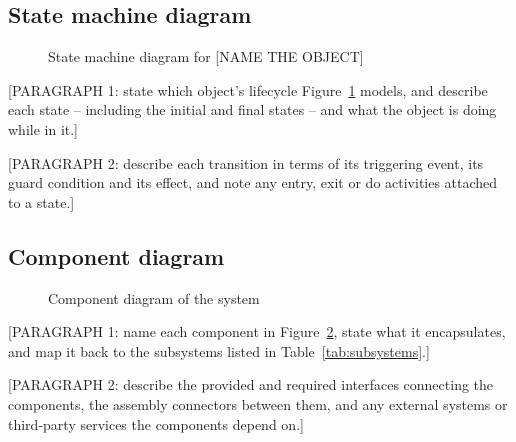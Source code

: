 \subsection{State machine diagram}
\label{subsec:state-diagram}

\begin{figure}[H]
  \centering
  \caption{State machine diagram for [NAME THE OBJECT]}
  \label{fig:state-diagram}
\end{figure}

[PARAGRAPH 1: state which object's lifecycle
Figure~\ref{fig:state-diagram} models, and describe each state --
including the initial and final states -- and what the object is doing
while in it.]

[PARAGRAPH 2: describe each transition in terms of its triggering
event, its guard condition and its effect, and note any entry, exit or
do activities attached to a state.]

\subsection{Component diagram}
\label{subsec:component-diagram}

\begin{figure}[H]
  \centering
  \caption{Component diagram of the system}
  \label{fig:component-diagram}
\end{figure}

[PARAGRAPH 1: name each component in
Figure~\ref{fig:component-diagram}, state what it encapsulates, and map
it back to the subsystems listed in Table~\ref{tab:subsystems}.]

[PARAGRAPH 2: describe the provided and required interfaces connecting
the components, the assembly connectors between them, and any external
systems or third-party services the components depend on.]
